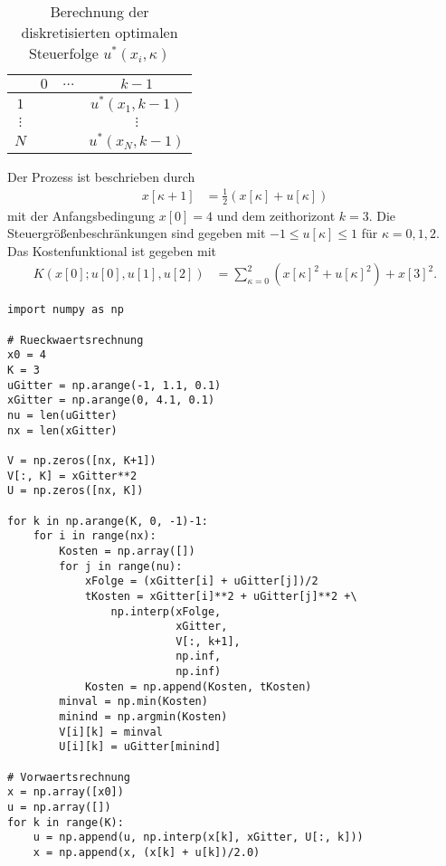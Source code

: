 \begin{table}[htb]
\caption{Berechnung der diskretisierten optimalen Steuerfolge $u^{\ast}(x_i,\kappa)$}
\centering
\begin{tabular}{|c|ccc|}
	\hline
	\diagbox{$i$}{$\kappa$} 	& $0$ 	& $\ldots$ 	& $k-1$\\\hline
	$1$							& 		& 			& $u^{\ast}(x_1,k-1)$\\
	$\vdots$					& 		& 			& $\vdots$\\
	$N$							& 		& 			& $u^{\ast}(x_N,k-1)$\\\hline
\end{tabular}
\label{tab:kap_3_dyn_prog_optu}
\end{table}
\begin{exmp}
Der Prozess ist beschrieben durch
\begin{align}
	x[\kappa + 1] & = \frac{1}{2}\left(x[\kappa]+u[\kappa] \right)
\end{align}
mit der Anfangsbedingung $x[0] = 4$ und dem zeithorizont $k=3$. Die Steuergrößenbeschränkungen sind gegeben mit $-1\leq u[\kappa]\leq 1$ für $\kappa =
0,1,2$. Das Kostenfunktional ist gegeben mit
\begin{align}
	K\left(x[0];u[0],u[1],u[2] \right) & = \sum\limits_{\kappa = 0}^2\left(x[\kappa]^2+u[\kappa]^2 \right) + x[3]^2.
\end{align}
\begin{lstlisting}[style=PythonStyle, caption=Numerische Algorithmus der \ac{DP} am \exmpref{exmp:kap_3_zeitdis_opt_2}, label=code:kap_3_sec_1_num_dp] 
import numpy as np

# Rueckwaertsrechnung
x0 = 4
K = 3
uGitter = np.arange(-1, 1.1, 0.1)
xGitter = np.arange(0, 4.1, 0.1)
nu = len(uGitter)
nx = len(xGitter)

V = np.zeros([nx, K+1])
V[:, K] = xGitter**2
U = np.zeros([nx, K])

for k in np.arange(K, 0, -1)-1:
    for i in range(nx):
        Kosten = np.array([])
        for j in range(nu):
            xFolge = (xGitter[i] + uGitter[j])/2
            tKosten = xGitter[i]**2 + uGitter[j]**2 +\
                np.interp(xFolge,
                          xGitter,
                          V[:, k+1],
                          np.inf,
                          np.inf)
            Kosten = np.append(Kosten, tKosten)
        minval = np.min(Kosten)
        minind = np.argmin(Kosten)
        V[i][k] = minval
        U[i][k] = uGitter[minind]

# Vorwaertsrechnung
x = np.array([x0])
u = np.array([])
for k in range(K):
    u = np.append(u, np.interp(x[k], xGitter, U[:, k]))
    x = np.append(x, (x[k] + u[k])/2.0)


\end{lstlisting}
\end{exmp}
